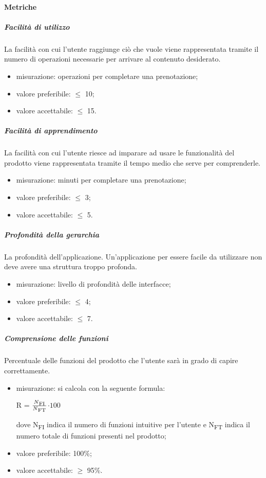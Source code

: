 		\paragraph{Metriche}
			\subparagraph{Facilità di utilizzo}
			La facilità con cui l'utente raggiunge ciò che vuole viene rappresentata tramite il numero di operazioni necessarie per arrivare al contenuto desiderato.
			\begin{itemize}
			\item misurazione: operazioni per completare una prenotazione;
			\item valore preferibile: $\leq$ 10;
			\item valore accettabile: $\leq$ 15.
			\end{itemize}
			\subparagraph{Facilità di apprendimento}
			La facilità con cui l'utente riesce ad imparare ad usare le funzionalità del prodotto viene rappresentata tramite il tempo medio che serve per comprenderle.
			\begin{itemize}
			\item misurazione: minuti per completare una prenotazione;
			\item valore preferibile: $\leq$ 3;
			\item valore accettabile: $\leq$ 5.
			\end{itemize}
			\subparagraph{Profondità della gerarchia}
			La profondità dell'applicazione. Un'applicazione per essere facile da utilizzare non deve avere una struttura troppo profonda.
			\begin{itemize}
			\item misurazione: livello di profondità delle interfacce;
			\item valore preferibile: $\leq$ 4;
			\item valore accettabile: $\leq$ 7.
			\end{itemize}
			\subparagraph{Comprensione delle funzioni}
			Percentuale delle funzioni del prodotto che l'utente sarà in grado di capire correttamente.
			\begin{itemize}
				\item misurazione: si calcola con la seguente formula: \\
			\centerline{ R =  \(\frac{N\textsubscript{FI}}{N\textsubscript{FT}} \)$ \cdot 100$ }
			dove N\textsubscript{FI} indica il numero di funzioni intuitive per l'utente e N\textsubscript{FT} indica il numero totale di funzioni presenti nel prodotto;
				\item valore preferibile: 100\%;
				\item valore accettabile: $\geq$ 95\%.
			\end{itemize}
